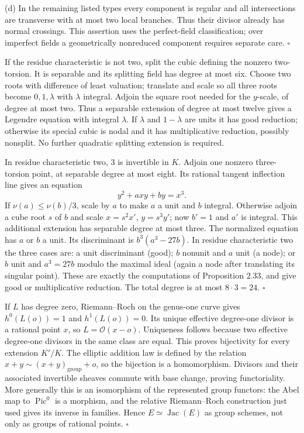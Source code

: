 \documentclass[11pt]{article}
\let\chapterexercise\exercise
\renewcommand{\exercise}[2]{\Needspace{8\baselineskip}\chapterexercise{#1}{#2}}
\begin{document}
(d) In the remaining listed types every component is regular and all intersections are transverse with at most two local branches. Thus their divisor already has normal crossings. This assertion uses the perfect-field classification; over imperfect fields a geometrically nonreduced component requires separate care. \hfill$\square$

\pf If the residue characteristic is not two, split the cubic defining the nonzero two-torsion. It is separable and its splitting field has degree at most six. Choose two roots with difference of least valuation; translate and scale so all three roots become $0,1,\lambda$ with $\lambda$ integral. Adjoin the square root needed for the $y$-scale, of degree at most two. Thus a separable extension of degree at most twelve gives a Legendre equation with integral $\lambda$. If $\lambda$ and $1-\lambda$ are units it has good reduction; otherwise its special cubic is nodal and it has multiplicative reduction, possibly nonsplit. No further quadratic splitting extension is required.

In residue characteristic two, $3$ is invertible in $K$. Adjoin one nonzero three-torsion point, at separable degree at most eight. Its rational tangent inflection line gives an equation
\[ y^2+axy+by=x^3. \]
If $\nu(a)\le\nu(b)/3$, scale by $a$ to make $a$ a unit and $b$ integral. Otherwise adjoin a cube root $s$ of $b$ and scale $x=s^2x'$, $y=s^3y'$; now $b'=1$ and $a'$ is integral. This additional extension has separable degree at most three. The normalized equation has $a$ or $b$ a unit. Its discriminant is $b^3(a^3-27b)$. In residue characteristic two the three cases are: a unit discriminant (good); $b$ nonunit and $a$ unit (a node); or $b$ unit and $a^3=27b$ modulo the maximal ideal (again a node after translating its singular point). These are exactly the computations of Proposition 2.33, and give good or multiplicative reduction. The total degree is at most $8\cdot3=24$. \hfill$\square$

\pf If $L$ has degree zero, Riemann--Roch on the genus-one curve gives $h^0(L(o))=1$ and $h^1(L(o))=0$. Its unique effective degree-one divisor is a rational point $x$, so $L=\mathcal O(x-o)$. Uniqueness follows because two effective degree-one divisors in the same class are equal. This proves bijectivity for every extension $K'/K$. The elliptic addition law is defined by the relation $x+y\sim(x+y)_{\mathrm{group}}+o$, so the bijection is a homomorphism. Divisors and their associated invertible sheaves commute with base change, proving functoriality. More generally this is an isomorphism of the represented group functors: the Abel map to $\operatorname{Pic}^0$ is a morphism, and the relative Riemann--Roch construction just used gives its inverse in families. Hence $E\simeq\operatorname{Jac}(E)$ as group schemes, not only as groups of rational points. \hfill$\square$
\end{document}
